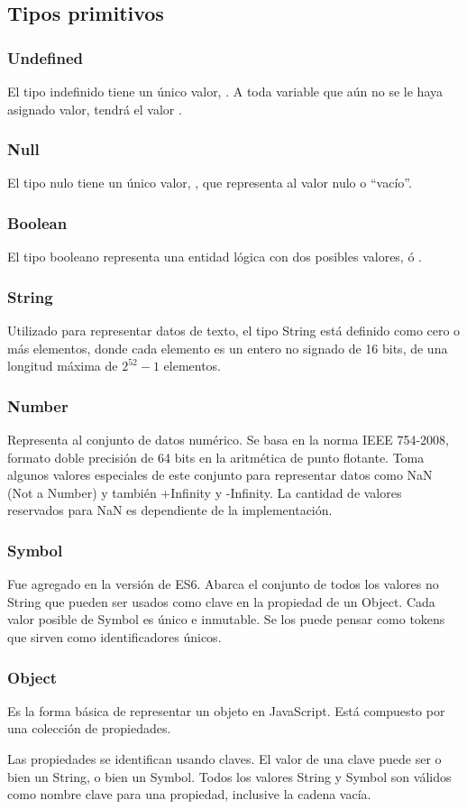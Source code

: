 \subsection{Tipos primitivos}
\label{subsec:introtiposprimitivos}

\subsubsection{Undefined} 
El tipo indefinido tiene un único valor, . A toda variable que aún no se le haya asignado valor, tendrá el valor .

\subsubsection{Null} 
El tipo nulo tiene un único valor, , que representa al valor nulo o "`vacío"'.

\subsubsection{Boolean} 
El tipo booleano representa una entidad lógica con dos posibles valores,  ó .

\subsubsection{String} 
Utilizado para representar datos de texto, el tipo String está definido como cero o más elementos, donde cada elemento es un entero no signado de 16 bits, de una longitud máxima de $2^{52}-1$ elementos.

\subsubsection{Number} 
Representa al conjunto de datos numérico. Se basa en la norma IEEE 754-2008, formato doble precisión de 64 bits en la aritmética de punto flotante. Toma algunos valores especiales de este conjunto para representar datos como NaN (Not a Number) y también +Infinity y -Infinity. La cantidad de valores reservados para NaN es dependiente de la implementación.

\subsubsection{Symbol} 
Fue agregado en la versión de ES6. Abarca el conjunto de todos los valores no String que pueden ser usados como clave en la propiedad de un Object. Cada valor posible de Symbol es único e inmutable. Se los puede pensar como tokens que sirven como identificadores únicos. 

\subsubsection{Object} 
Es la forma básica de representar un objeto en JavaScript. Está compuesto por una colección de propiedades.

Las propiedades se identifican usando claves. El valor de una clave puede ser o bien un String, o bien un Symbol. Todos los valores String y Symbol son válidos como nombre clave para una propiedad, inclusive la cadena vacía. 
